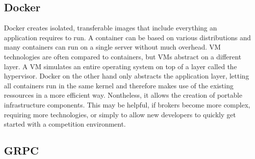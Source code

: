 
\subsection{Docker}
\label{sub:docker}

Docker creates isolated, transferable images that include everything an application requires to run. A
container can be based on various distributions and many containers can run on a single server without much overhead.
\ac{VM} technologies are often compared to containers, but \ac{VM}s abstract on a different layer. A \ac{VM} simulates
an entire operating system on top of a layer called the hypervisor. Docker on the other hand only abstracts the
application layer, letting all containers run in the same kernel and therefore makes use of the existing ressources in a
more efficient way. Nontheless, it allows the creation of portable infrastructure components. This may be helpful, if
brokers become more complex, requiring more technologies, or simply to allow new developers to quickly get started with
a competition environment. 

\subsection{\ac{GRPC}}%
\label{sub:grpc}

